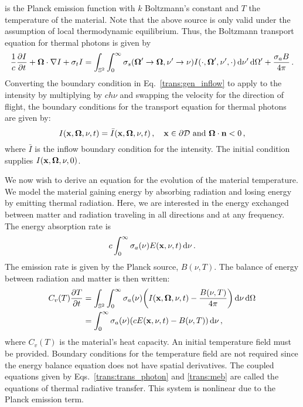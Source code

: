 \documentclass[../doc.tex]{subfiles}
\begin{document}
is the Planck emission function with $k$ Boltzmann's constant and $T$ the temperature of the material. Note that the above source is only valid under the assumption of local thermodynamic equilibrium. 
Thus, the Boltzmann transport equation for thermal photons is given by 
	\begin{equation} \label{trans:trans_photon}
		\frac{1}{c}\frac{\partial I}{\partial t} + \boldsymbol{\Omega}\cdot\nabla I + \sigma_t I = \int_{\mathbb{S}^2}\int_0^\infty \sigma_s(\boldsymbol{\Omega}'\rightarrow\boldsymbol{\Omega},\nu'\rightarrow \nu) I(\cdot,\boldsymbol{\Omega}',\nu',\cdot) \mathop{}\!\mathrm{d} \nu'\mathop{}\!\mathrm{d}\Omega' + \frac{\sigma_a B}{4\pi} \,. 
	\end{equation}
Converting the boundary condition in Eq.~\ref{trans:gen_inflow} to apply to the intensity by multiplying by $ch\nu$ and swapping the velocity for the direction of flight, the boundary conditions for the transport equation for thermal photons are given by: 
	\begin{equation}
		I(\boldsymbol{\mathrm{x}},\boldsymbol{\Omega},\nu,t) = \bar{I}(\boldsymbol{\mathrm{x}},\boldsymbol{\Omega},\nu,t) \,, \quad \boldsymbol{\mathrm{x}} \in \partial \mathcal{D} \ \mathrm{and} \ \boldsymbol{\Omega}\cdot\boldsymbol{\mathrm{n}} < 0 \,, 
	\end{equation}
where $\bar{I}$ is the inflow boundary condition for the intensity. The initial condition supplies $I(\boldsymbol{\mathrm{x}},\boldsymbol{\Omega},\nu,0)$. 

We now wish to derive an equation for the evolution of the material temperature. We model the material gaining energy by absorbing radiation and losing energy by emitting thermal radiation. Here, we are interested in the energy exchanged between matter and radiation traveling in all directions and at any frequency. 
The energy absorption rate is 
	\begin{equation}
		c\int_0^\infty \sigma_a(\nu) E(\boldsymbol{\mathrm{x}},\nu,t) \mathop{}\!\mathrm{d} \nu \,. 
	\end{equation}
The emission rate is given by the Planck source, $B(\nu,T)$.
The balance of energy between radiation and matter is then written: 
	\begin{equation} \label{trans:meb}
	\begin{aligned}
		C_v(T) \frac{\partial T}{\partial t} &= \int_{\mathbb{S}^2} \int_0^\infty \sigma_a(\nu)\!\left( I(\boldsymbol{\mathrm{x}},\boldsymbol{\Omega},\nu,t) - \frac{B(\nu,T)}{4\pi} \right) \mathop{}\!\mathrm{d} \nu \mathop{}\!\mathrm{d} \Omega \\
		&= \int_0^\infty \sigma_a(\nu) (c E(\boldsymbol{\mathrm{x}},\nu,t) - B(\nu,T)) \mathop{}\!\mathrm{d} \nu \,, 
	\end{aligned}
	\end{equation}
where $C_v(T)$ is the material's heat capacity. 
An initial temperature field must be provided. Boundary conditions for the temperature field are not required since the energy balance equation does not have spatial derivatives. 
The coupled equations given by Eqs.~\ref{trans:trans_photon} and \ref{trans:meb} are called the equations of thermal radiative transfer. This system is nonlinear due to the Planck emission term. 
\end{document}
